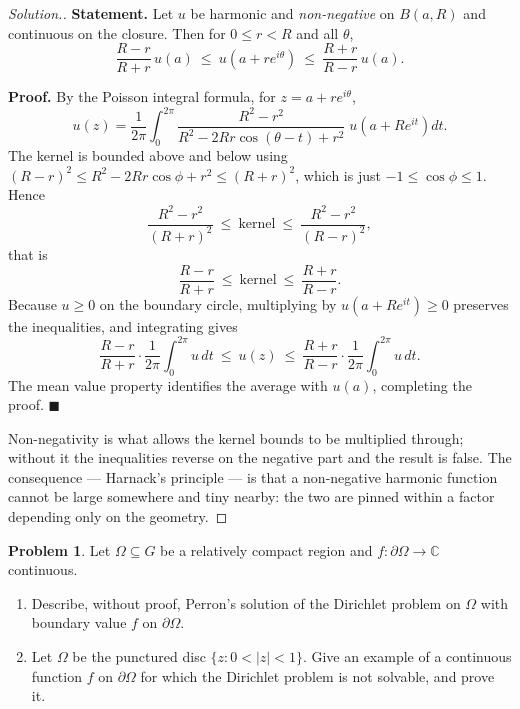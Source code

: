 \documentclass[11pt,a4paper]{article}
\theoremstyle{definition}
\newtheorem{problemx}{Problem}[section]
\newenvironment{problem}{\begin{problemx}}{\end{problemx}}
\newenvironment{solution}
  {\renewcommand{\qedsymbol}{}\begin{proof}[\textit{Solution}.]}
  {\end{proof}}
\begin{document}
\begin{solution}
\textbf{Statement.} Let $u$ be harmonic and \emph{non-negative} on
$B(a,R)$ and continuous on the closure. Then for $0 \leq r < R$ and all $\theta$,
$$\frac{R-r}{R+r}\,u(a) \ \leq\ u\!\left(a + re^{i\theta}\right)
\ \leq\ \frac{R+r}{R-r}\,u(a).$$

\textbf{Proof.} By the Poisson integral formula, for $z = a + re^{i\theta}$,
$$u(z) = \frac{1}{2\pi}\int^{2\pi}_{0}
\frac{R^{2}-r^{2}}{R^{2} - 2Rr\cos(\theta-t) + r^{2}}\;
u\!\left(a + Re^{it}\right)dt .$$
The kernel is bounded above and below using
$(R-r)^{2} \leq R^{2}-2Rr\cos\phi + r^{2} \leq (R+r)^{2}$, which is just
$-1 \leq \cos\phi \leq 1$. Hence
$$\frac{R^{2}-r^{2}}{(R+r)^{2}} \ \leq\ \text{kernel} \ \leq\ \frac{R^{2}-r^{2}}{(R-r)^{2}},$$
that is
$$\frac{R-r}{R+r} \ \leq\ \text{kernel} \ \leq\ \frac{R+r}{R-r}.$$
Because $u \geq 0$ on the boundary circle, multiplying by
$u(a+Re^{it}) \geq 0$ preserves the inequalities, and integrating gives
$$\frac{R-r}{R+r}\cdot\frac{1}{2\pi}\int^{2\pi}_{0}u\,dt
\ \leq\ u(z)\ \leq\
\frac{R+r}{R-r}\cdot\frac{1}{2\pi}\int^{2\pi}_{0}u\,dt .$$
The mean value property identifies the average with $u(a)$, completing the proof.
$\blacksquare$

Non-negativity is what allows the kernel bounds to be multiplied through; without
it the inequalities reverse on the negative part and the result is false. The
consequence --- Harnack's principle --- is that a non-negative harmonic function
cannot be large somewhere and tiny nearby: the two are pinned within a factor
depending only on the geometry.
\end{solution}


\begin{problem}
Let $\Omega \subseteq G$ be a relatively compact region and
$f : \partial\Omega \rightarrow \mathbb{C}$ continuous.
\begin{enumerate}
\item[(a).] Describe, without proof, Perron's solution of the Dirichlet problem
on $\Omega$ with boundary value $f$ on $\partial\Omega$.
\item[(b).] Let $\Omega$ be the punctured disc
$\{z : 0 < \left|z\right| < 1\}$. Give an example of a continuous function $f$ on
$\partial\Omega$ for which the Dirichlet problem is not solvable, and prove it.
\end{enumerate}
\end{problem}
\end{document}
